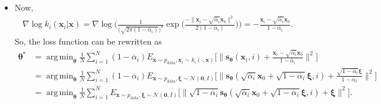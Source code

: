 \documentclass[10pt]{article}
\newcommand{\ve}[1]{\mathbf{#1}}
\newcommand{\mrm}[1]{\mathrm{#1}}
\newcommand{\ves}[1]{\boldsymbol{#1}}
\newcommand{\mcal}[1]{\mathcal{#1}}
\DeclareMathOperator*{\argmin}{arg\,min}
\begin{document}
\begin{itemize}
  \item Now,
  \begin{align*}
    \nabla \log k_i(\ve{x}_i| \ve{x}) 
    = \nabla \log \bigg( \frac{1}{\big(\sqrt{2\pi(1 - \overline{\alpha}_i)}\big)^d} \exp \bigg(  \frac{-\|\ve{x}_i - \sqrt{\overline{\alpha}_i}\ve{x}_0 \|^2 }{2(1 - \overline{\alpha}_i)} \bigg)\bigg)
    = -\frac{\ve{x}_i - \sqrt{\overline{\alpha}_i}\ve{x}_0 }{1 - \overline{\alpha}_i}.
  \end{align*}
  So, the loss function can be rewritten as
  \begin{align*}
    \ves{\theta}^* 
    &= \argmin_{\ves{\theta}} \frac{1}{N} \sum_{i=1}^N (1 - \overline{\alpha}_i) E_{\ve{x}\sim p_{\mrm{data}}, \ve{x}_i \sim k_i(\cdot,\ve{x})} \bigg[ \bigg\| \ve{s}_{\ves{\theta}}(\ve{x}_i,i) + \frac{\ve{x}_i - \sqrt{\overline{\alpha}_i}\ve{x}_0 }{1 - \overline{\alpha}_i} \bigg\|^2 \bigg] \\
    &= \argmin_{\ves{\theta}} \frac{1}{N} \sum_{i=1}^N (1 - \overline{\alpha}_i) E_{\ve{x}\sim p_{\mrm{data}}, \ves{\xi} \sim \mcal{N}(\ve{0}, I)} \bigg[ \bigg\| \ve{s}_{\ves{\theta}}(\sqrt{\overline{\alpha}_i} \ve{x}_0 + \sqrt{1 - \overline{\alpha}_i}\ves{\xi},i) + \frac{ \sqrt{1 - \overline{\alpha}_i}\ves{\xi} }{1 - \overline{\alpha}_i} \bigg\|^2 \bigg] \\    
    &= \argmin_{\ves{\theta}} \frac{1}{N} \sum_{i=1}^N E_{\ve{x}\sim p_{\mrm{data}}, \ves{\xi} \sim \mcal{N}(\ve{0}, I)} \big[ \big\| \sqrt{1 - \overline{\alpha}_i} \ve{s}_{\ves{\theta}}(\sqrt{\overline{\alpha}_i} \ve{x}_0 + \sqrt{1 - \overline{\alpha}_i}\ves{\xi},i) + \ves{\xi} \big\|^2 \big].
  \end{align*}


\end{itemize}
\end{document}
